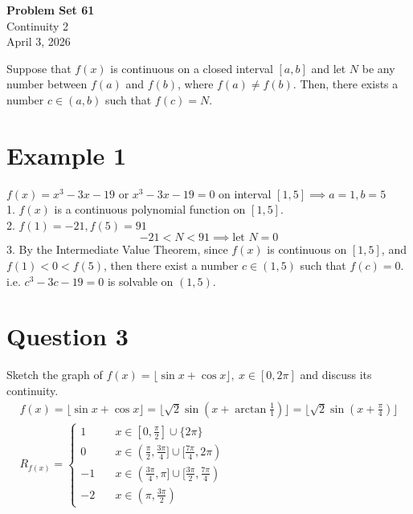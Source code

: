 \documentclass[12pt]{article}
\newcommand{\floor}[1]{\lfloor #1 \rfloor}
\newcommand{\theorem}[2]{\begin{tcolorbox}[title={#1},colback=blue!5!white,colframe=blue!75!black,parbox=false] #2 \end{tcolorbox}}
\begin{document}
\vspace*{0cm}

\begin{center}
    {\Large \bfseries Problem Set 61} \\[0.5cm]
    {\large Continuity 2} \\[0.35cm]
    {\normalsize April 3, 2026}
\end{center}


\theorem{The Intermediate Value Theorem (IVT)}{Suppose that $f(x)$ is continuous on a closed interval $[a,b]$ and let $N$ be any number between $f(a)$ and $f(b)$, where $f(a) \ne f(b)$. Then, there exists a number $c \in (a,b)$ such that $f(c)=N$.}

\section{Example 1}
$f(x)=x^3-3x-19 $ or $ x^3-3x-19=0$ on interval $[1,5] \implies a=1,b=5$ \vspace{0.3em} \\
1. $f(x)$ is a continuous polynomial function on $[1,5]$.\\
2. $f(1)=-21, f(5)=91$
\[
-21<N<91 \implies \text{let }N=0
\]
3. By the Intermediate Value Theorem, since $f(x)$ is continuous on $[1,5]$, and $f(1)<0<f(5)$, then there exist a number $c\in (1,5)$ such that $f(c)=0$. i.e. $c^3-3c-19=0$ is solvable on $(1,5)$. \vspace{0.5em}

\section{Question 3}
Sketch the graph of $f(x)=\floor{\sin x + \cos x}, \ x \in [0,2\pi]$ and discuss its continuity.
\begin{gather*}
    f(x)=\floor{\sin x + \cos x}=\floor{\sqrt{2}\sin(x+\arctan \frac{1}{1})}=\floor{\sqrt{2}\sin (x+\frac{\pi}{4})}\\
    R_{f(x)}=\begin{cases}
        1 \quad &x \in [0, \frac{\pi}{2}] \cup \{2\pi\}\\
        0 \quad &x \in (\frac{\pi}{2}, \frac{3\pi}{4}] \cup [\frac{7\pi}{4}, 2\pi)\\
        -1 \quad &x \in (\frac{3\pi}{4}, \pi] \cup [\frac{3\pi}{2}, \frac{7\pi}{4})\\
        -2 \quad &x \in (\pi, \frac{3\pi}{2})
    \end{cases}
\end{gather*}
\end{document}
